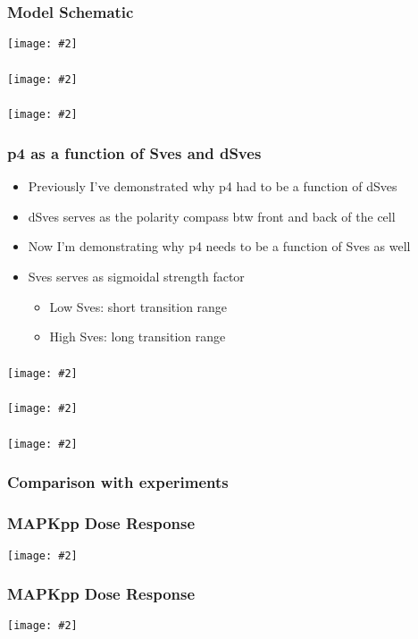 \documentclass{beamer}
\newcommand{\plotslide}[2]{
  \begin{frame}
    \frametitle{#1}
    \centering
    \texttt{[image: \#2]}
  \end{frame}
}
\begin{document}
\plotslide{Model Schematic}{../tikz/flow.pdf}

\iffalse
\plotslide{Constant p4}{constant_p4_func.pdf}
\plotslide{Constant p4}{p4a_sign_change_Sves.pdf}
\plotslide{Constant p4}{p4a_sign_change_MI.pdf}

\begin{frame}
  \frametitle{Constant p4}
  \begin{itemize}
    \item Positive amp is good for native
    \item Negative amp is good for overexpressed
    \item Smoothly change amp w.r.t expression level
  \end{itemize}
\end{frame}

\plotslide{Coupled p4}{coupled_p4_func.pdf}
\plotslide{Coupled p4}{Sves_coupled_p4.pdf}
\plotslide{Coupled p4}{MI_coupled_p4.pdf}

\fi


\plotslide{}{StotVsMAPKpp.pdf}

\plotslide{}{SmemVsp3.pdf}

\begin{frame}
  \frametitle{p4 as a function of Sves and dSves}
  \begin{itemize}
    \itemsep3em
    \item Previously I've demonstrated why p4 had to be a function of dSves
    \item dSves serves as the polarity compass btw front and back of the cell
    \item Now I'm demonstrating why p4 needs to be a function of Sves as
      well
    \item Sves serves as sigmoidal strength factor
      \begin{itemize}
          \item Low Sves: short transition range
          \item High Sves: long transition range
      \end{itemize}
  \end{itemize}
\end{frame}
\plotslide{}{fig-p4func.pdf}
\plotslide{}{fig-p4func3D_0.pdf}
\plotslide{}{fig-p4func3D_1.pdf}

\begin{frame}
  \frametitle{Comparison with experiments}
\end{frame}

\plotslide{MAPKpp Dose Response}{../hao/dose_response_ERK_t.png}
\plotslide{MAPKpp Dose Response}{InputVsMAPKpp.pdf} 
\end{document}
